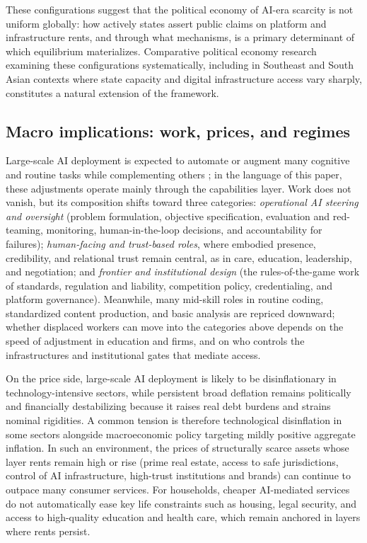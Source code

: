 \documentclass[11pt]{article}
\begin{document}
These configurations suggest that the political economy of AI-era scarcity is not uniform globally: how actively states assert public claims on platform and infrastructure rents, and through what mechanisms, is a primary determinant of which equilibrium materializes. Comparative political economy research examining these configurations systematically, including in Southeast and South Asian contexts where state capacity and digital infrastructure access vary sharply, constitutes a natural extension of the framework.

\subsection{\texorpdfstring{Macro implications: work, prices, and regimes}{Macro implications: work, prices, and regimes}}
\label{subsec:macro_regimes}

Large-scale AI deployment is expected to automate or augment many cognitive and routine tasks while complementing others \citep[e.g.][]{AcemogluRestrepo2018}; in the language of this paper, these adjustments operate mainly through the capabilities layer. Work does not vanish, but its composition shifts toward three categories: \emph{operational AI steering and oversight} (problem formulation, objective specification, evaluation and red-teaming, monitoring, human-in-the-loop decisions, and accountability for failures); \emph{human-facing and trust-based roles}, where embodied presence, credibility, and relational trust remain central, as in care, education, leadership, and negotiation; and \emph{frontier and institutional design} (the rules-of-the-game work of standards, regulation and liability, competition policy, credentialing, and platform governance). Meanwhile, many mid-skill roles in routine coding, standardized content production, and basic analysis are repriced downward; whether displaced workers can move into the categories above depends on the speed of adjustment in education and firms, and on who controls the infrastructures and institutional gates that mediate access.

On the price side, large-scale AI deployment is likely to be disinflationary in technology-intensive sectors, while persistent broad deflation remains politically and financially destabilizing because it raises real debt burdens and strains nominal rigidities. A common tension is therefore technological disinflation in some sectors alongside macroeconomic policy targeting mildly positive aggregate inflation. In such an environment, the prices of structurally scarce assets whose layer rents remain high or rise (prime real estate, access to safe jurisdictions, control of AI infrastructure, high-trust institutions and brands) can continue to outpace many consumer services. For households, cheaper AI-mediated services do not automatically ease key life constraints such as housing, legal security, and access to high-quality education and health care, which remain anchored in layers where rents persist.
\end{document}
